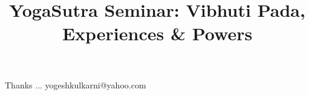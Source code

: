 \documentclass[xcolor=dvipsnames,compress,t,pdf,9pt]{beamer}
\title[\insertframenumber /\inserttotalframenumber]{YogaSutra Seminar: Vibhuti Pada, Experiences \& Powers}
\begin{document}
	\begin{frame}
	\titlepage
	\end{frame}

	

	\begin{frame}[c]{}
	Thanks ...
	\vspace{5mm}
	yogeshkulkarni@yahoo.com
	\end{frame}
\end{document}
